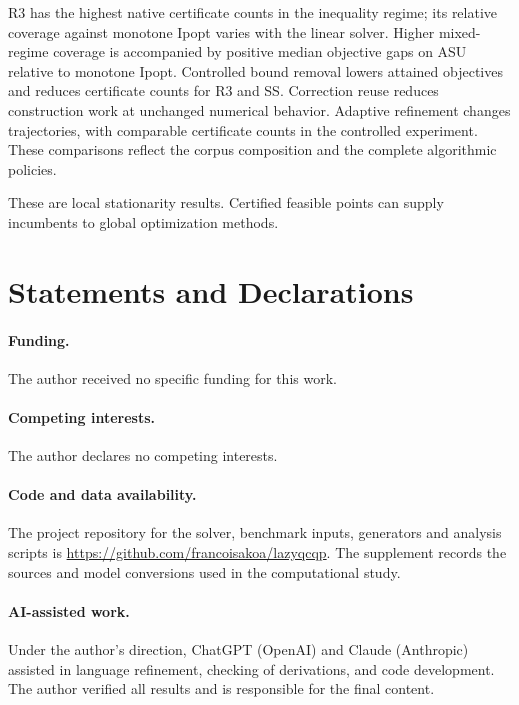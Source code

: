 \documentclass[pdflatex,sn-mathphys-num]{sn-jnl}
\theoremstyle{thmstyleone}
\theoremstyle{thmstylethree}
\newcounter{algorithm}
\begin{document}
R3 has the highest native certificate counts in the inequality regime;
its relative coverage against monotone Ipopt varies with the linear solver.
Higher mixed-regime coverage is accompanied by positive median objective
gaps on ASU relative to monotone Ipopt.
Controlled bound removal lowers attained objectives and reduces certificate
counts for R3 and SS. Correction reuse reduces construction work at
unchanged numerical behavior. Adaptive refinement changes trajectories,
with comparable certificate counts in the controlled experiment. These
comparisons reflect the corpus composition and the complete algorithmic policies.

These are local stationarity results. Certified feasible points can supply
incumbents to global optimization methods.

\section*{Statements and Declarations}
\paragraph{Funding.}
The author received no specific funding for this work.

\paragraph{Competing interests.}
The author declares no competing interests.

\paragraph{Code and data availability.}
The project repository for the solver, benchmark inputs, generators and
analysis scripts is \url{https://github.com/francoisakoa/lazyqcqp}.
The supplement records the sources and model conversions used in the
computational study.

\paragraph{AI-assisted work.}
Under the author’s direction, ChatGPT (OpenAI) and Claude (Anthropic)
assisted in language refinement, checking of derivations, and code
development. The author verified all results and is responsible for the
final content.
\end{document}
